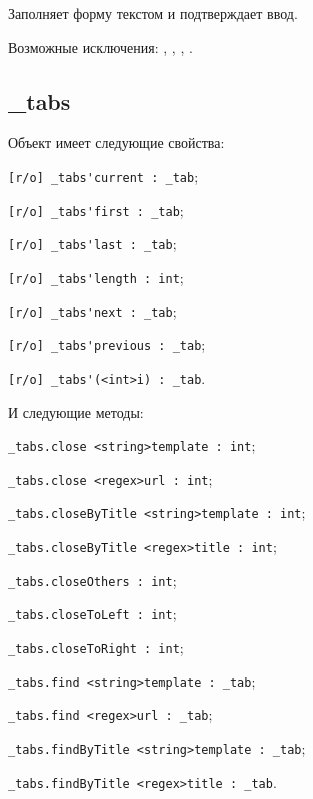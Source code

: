 Заполняет форму текстом  и подтверждает ввод.

Возможные исключения: , , , .


\subsection{{\color{orange} \_tabs}}

Объект \tabs{} имеет следующие свойства:
\begin{icItems}
	\item \lstinline|[r/o] _tabs'current : _tab|;
	\item \lstinline|[r/o] _tabs'first : _tab|;
	\item \lstinline|[r/o] _tabs'last : _tab|;
	\item \lstinline|[r/o] _tabs'length : int|;
	\item \lstinline|[r/o] _tabs'next : _tab|;
	\item \lstinline|[r/o] _tabs'previous : _tab|;
	\item \lstinline|[r/o] _tabs'(<int>i) : _tab|.
\end{icItems}

И следующие методы:
\begin{icItems}
	\item \lstinline|_tabs.close <string>template : int|;
	\item \lstinline|_tabs.close <regex>url : int|;
	\item \lstinline|_tabs.closeByTitle <string>template : int|;
	\item \lstinline|_tabs.closeByTitle <regex>title : int|;
	\item \lstinline|_tabs.closeOthers : int|;
	\item \lstinline|_tabs.closeToLeft : int|;
	\item \lstinline|_tabs.closeToRight : int|;
	\item \lstinline|_tabs.find <string>template : _tab|;
	\item \lstinline|_tabs.find <regex>url : _tab|;
	\item \lstinline|_tabs.findByTitle <string>template : _tab|;
	\item \lstinline|_tabs.findByTitle <regex>title : _tab|.
\end{icItems}

